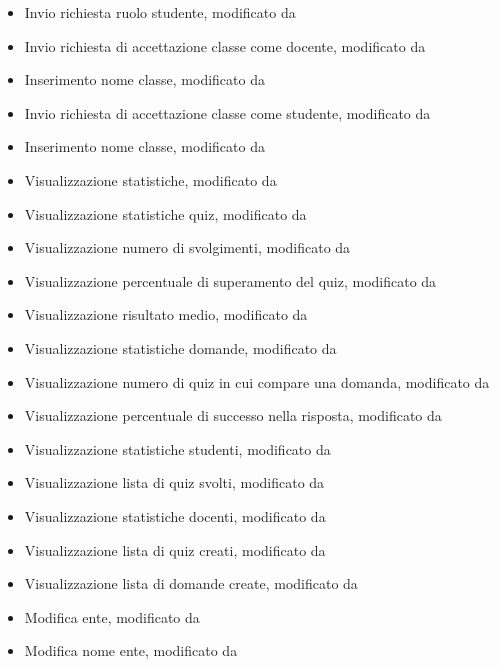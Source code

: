 \begin{itemize}
	\item {} Invio richiesta ruolo studente, modificato da 
	\item {} Invio richiesta di accettazione classe come docente, modificato da 
	\item {} Inserimento nome classe, modificato da 
	\item {} Invio richiesta di accettazione classe come studente, modificato da 
	\item {} Inserimento nome classe, modificato da 
	\item {} Visualizzazione statistiche, modificato da 
	\item {} Visualizzazione statistiche quiz, modificato da 
	\item {} Visualizzazione numero di svolgimenti, modificato da 
	\item {} Visualizzazione percentuale di superamento del quiz, modificato da 
	\item {} Visualizzazione risultato medio, modificato da 
	\item {} Visualizzazione statistiche domande, modificato da 
	\item {} Visualizzazione numero di quiz in cui compare una domanda, modificato da 
	\item {} Visualizzazione percentuale di successo nella risposta, modificato da 
	\item {} Visualizzazione statistiche studenti, modificato da 
	\item {} Visualizzazione lista di quiz svolti, modificato da 
	\item {} Visualizzazione statistiche docenti, modificato da 
	\item {} Visualizzazione lista di quiz creati, modificato da 
	\item {} Visualizzazione lista di domande create, modificato da 
	\item {} Modifica ente, modificato da 
	\item {} Modifica nome ente, modificato da 

\end{itemize}
